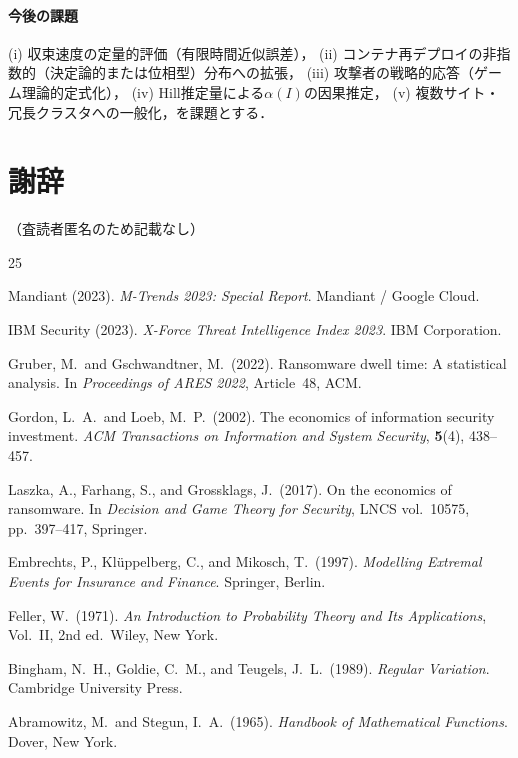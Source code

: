 \documentclass[12pt,a4paper]{article}
\theoremstyle{plain}
\theoremstyle{definition}
\theoremstyle{remark}
\begin{document}
\paragraph{今後の課題}
(i) 収束速度の定量的評価（有限時間近似誤差），
(ii) コンテナ再デプロイの非指数的（決定論的または位相型）分布への拡張，
(iii) 攻撃者の戦略的応答（ゲーム理論的定式化），
(iv) Hill推定量による$\alpha(I)$の因果推定，
(v) 複数サイト・冗長クラスタへの一般化，を課題とする．

\section*{謝辞}
（査読者匿名のため記載なし）

\begin{thebibliography}{25}

Mandiant (2023).
\textit{M-Trends 2023: Special Report}.
Mandiant / Google Cloud.

IBM Security (2023).
\textit{X-Force Threat Intelligence Index 2023}.
IBM Corporation.

Gruber, M.\ and Gschwandtner, M.\ (2022).
Ransomware dwell time: A statistical analysis.
In \textit{Proceedings of ARES 2022}, Article~48, ACM.

Gordon, L.\ A.\ and Loeb, M.\ P.\ (2002).
The economics of information security investment.
\textit{ACM Transactions on Information and System Security},
\textbf{5}(4), 438--457.

Laszka, A., Farhang, S., and Grossklags, J.\ (2017).
On the economics of ransomware.
In \textit{Decision and Game Theory for Security},
LNCS vol.~10575, pp.~397--417, Springer.

Embrechts, P., Kl\"{u}ppelberg, C., and Mikosch, T.\ (1997).
\textit{Modelling Extremal Events for Insurance and Finance}.
Springer, Berlin.

Feller, W.\ (1971).
\textit{An Introduction to Probability Theory and Its Applications},
Vol.~II, 2nd ed.\ Wiley, New York.

Bingham, N.\ H., Goldie, C.\ M., and Teugels, J.\ L.\ (1989).
\textit{Regular Variation}.
Cambridge University Press.

Abramowitz, M.\ and Stegun, I.\ A.\ (1965).
\textit{Handbook of Mathematical Functions}.
Dover, New York.


\end{thebibliography}
\end{document}
